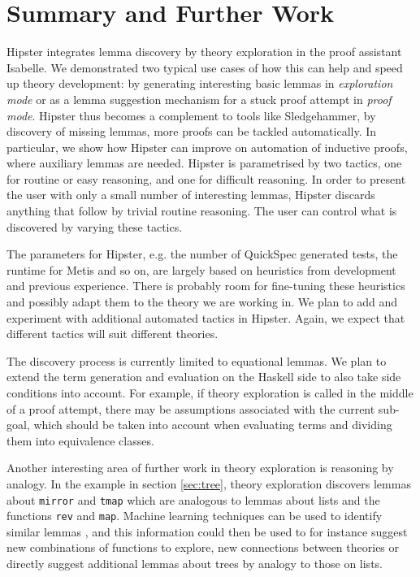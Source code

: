 \section{Summary and Further Work}
\label{sec:concl}

Hipster integrates lemma discovery by theory exploration in the proof assistant Isabelle. We demonstrated two typical use cases of how this can help and speed up theory development: by generating interesting basic lemmas in \emph{exploration mode} or as a lemma suggestion mechanism for a stuck proof attempt in \emph{proof mode}. Hipster thus becomes a complement to tools like Sledgehammer, by discovery of missing lemmas, more proofs can be tackled automatically. In particular, we show how Hipster can improve on automation of inductive proofs, where auxiliary lemmas are needed. Hipster is parametrised by two tactics, one for routine or easy reasoning, and one for difficult reasoning. In order to present the user with only a small number of interesting lemmas, Hipster discards anything that follow by trivial routine reasoning. The user can control what is discovered by varying these tactics. 

The parameters for Hipster, e.g. the number of QuickSpec generated tests, the runtime for Metis and so on, are largely based on heuristics from development and previous experience. There is probably room for fine-tuning these heuristics and possibly adapt them to the theory we are working in. We plan to add and experiment with additional automated tactics in Hipster. Again, we expect that different tactics will suit different theories.
 
The discovery process is currently limited to equational lemmas. We plan to extend the term generation and evaluation on the Haskell side to also take side conditions into account. For example, if theory exploration is called in the middle of a proof attempt, there may be assumptions associated with the current sub-goal, which should be taken into account when evaluating terms and dividing them into equivalence classes. 

Another interesting area of further work in theory exploration is reasoning by analogy. In the example in section \ref{sec:tree}, theory exploration discovers lemmas about \texttt{mirror} and \texttt{tmap} which are analogous to lemmas about lists and the functions \texttt{rev} and \texttt{map}. Machine learning techniques can be used to identify similar lemmas \cite{acl2ml}, and this information could then be used to for instance suggest new combinations of functions to explore, new connections between theories or directly suggest additional lemmas about trees by analogy to those on lists.  

